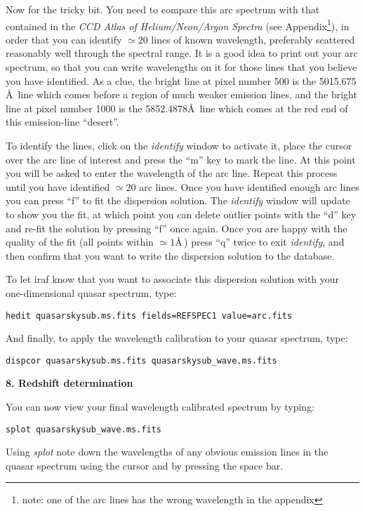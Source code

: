 Now for the tricky bit. You need to compare this arc spectrum with that
contained in the {\em CCD Atlas of Helium/Neon/Argon Spectra} (see Appendix\footnote{note: one of the 
arc lines has the wrong wavelength in the appendix}), 
in order that you can identify $\simeq 20$ lines of known wavelength, preferably
scattered reasonably well through the spectral range. 
It is a good idea to print out your arc spectrum, so that you can write
wavelengths on it for those lines that you believe you have identified.
As a clue, the bright line at pixel number 500 is the 5015.675 \AA\ line
which comes before a region of much weaker emission lines, and the bright
line at pixel number 1000 is the 5852.4878\AA\ line which comes at the red
end of this emission-line ``desert''. 


To identify the lines, click on the {\it identify} window to activate
it, place the cursor over the arc line of interest and press the ``m''
key to mark the line. At this point you will be asked to enter the
wavelength of the arc line. Repeat this process
until you have identified $\simeq20$ arc lines. Once you have
identified enough arc lines you can press ``f'' to fit the dispersion
solution. The {\it identify} window will update to show you the fit,
at which point you can delete outlier points with the ``d'' key and
re-fit the solution by pressing ``f'' once again. Once you are happy
with the quality of the fit (all points within $\simeq1$\AA\,) press
``q'' twice to exit {\it identify}, and then confirm that you want to 
write the dispersion solution to the database.

To let {\sc iraf} know that you want to associate this dispersion
solution with your one-dimensional quasar spectrum, type:

{\tt hedit quasarskysub.ms.fits fields=REFSPEC1 value=arc.fits}

And finally, to apply the wavelength calibration to your quasar
spectrum, type:

{\tt dispcor quasarskysub.ms.fits \verb,quasarskysub_wave.ms.fits,}


{\large {\bf 8. Redshift determination}}

You can now view your final wavelength calibrated spectrum by typing:

{\tt splot \verb,quasarskysub_wave.ms.fits,}

Using {\it splot} note down the wavelengths of any obvious emission
lines in the quasar spectrum using the cursor and by pressing the space bar.


